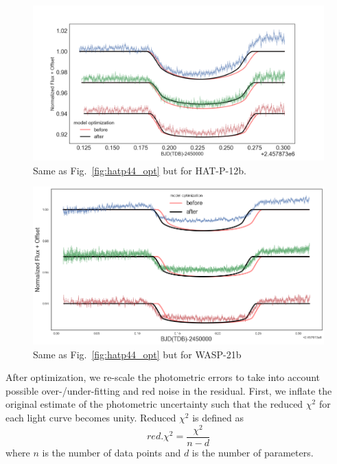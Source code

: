 \begin{figure}
\centering
\includegraphics[width=12cm]{hatp12/optimized_transit_model.png}
\caption{Same as Fig.~\ref{fig:hatp44_opt} but for HAT-P-12b.}
\label{fig:hatp12_opt}
\end{figure}

\begin{figure}
\centering
\includegraphics[width=12cm]{wasp21/optimized_transit_model.png}
\caption{Same as Fig.~\ref{fig:hatp44_opt} but for WASP-21b}
\label{fig:wasp21_opt}
\end{figure}

After optimization, we re-scale the photometric errors to take into account possible over-/under-fitting and red noise in the residual. First, we inflate the original estimate of the photometric uncertainty such that the reduced $\chi^2$ for each light curve becomes unity. Reduced $\chi^2$ is defined as
\begin{equation}
red. \chi^2= \frac{\chi^2}{n-d}
\end{equation}
where $n$ is the number of data points and $d$ is the number of parameters.

